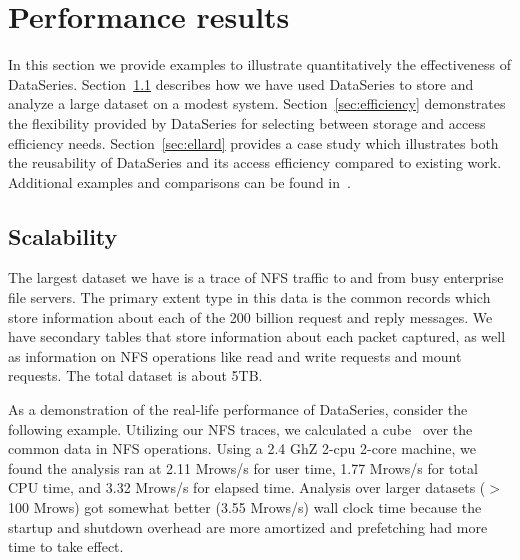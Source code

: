 \documentclass{acm_proc_article-sp}
\begin{document}
\section{Performance results}\label{sec:results}


In this section we provide examples to illustrate quantitatively the 
effectiveness of DataSeries.  
Section~\ref{sec:scale} describes how we have used DataSeries to store 
and analyze a large dataset on a modest system.
Section~\ref{sec:efficiency} demonstrates the flexibility provided
by DataSeries for selecting between storage and access efficiency needs.
Section~\ref{sec:ellard} provides a case study which illustrates
both the reusability of DataSeries and its access efficiency compared
to existing work.
Additional examples and comparisons can be found 
in~\cite{DSTechnicalReportSnapshot}.

\subsection{Scalability}\label{sec:scale}

The largest dataset we have is a trace of NFS traffic to and from
busy enterprise file servers.
The primary extent type 
in this data is the common records which store information about each
of the 200 billion request and reply messages. We have secondary tables that
store information about each packet captured, as well as 
information on NFS operations 
like read and write requests and mount requests.  
The total dataset
is about 5TB.

As a demonstration of the real-life performance of DataSeries,
consider the following example.  Utilizing our NFS traces, we
calculated a cube~\cite{gray97cube} over the common data in NFS
operations.  Using a 2.4 GhZ 2-cpu 2-core machine, we found the
analysis ran at 2.11 Mrows/s for user time, 1.77 Mrows/s for total CPU
time, and 3.32 Mrows/s for elapsed time.  Analysis over larger
datasets ($>$100 Mrows) got somewhat better (3.55 Mrows/s) wall clock
time because the startup and shutdown overhead are more amortized and
prefetching had more time to take effect.
\end{document}
